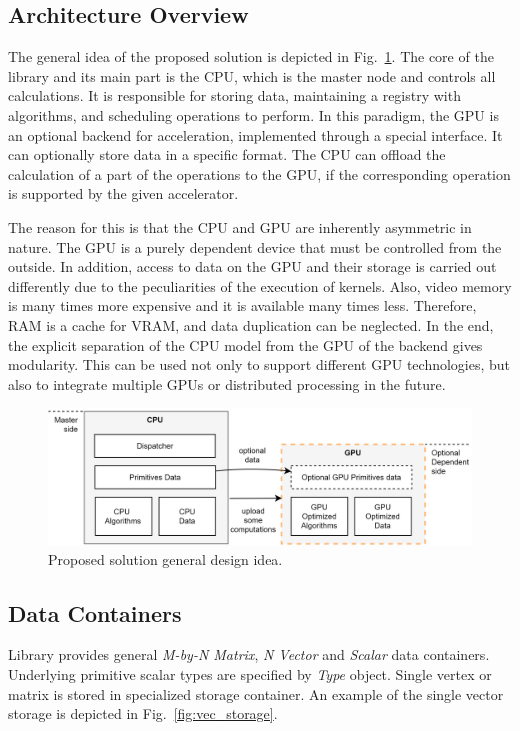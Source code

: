 \subsection{Architecture Overview}

The general idea of the proposed solution is depicted in Fig.~\ref{fig:design}. 
The core of the library and its main part is the CPU, which is the master node and controls all calculations. 
It is responsible for storing data, maintaining a registry with algorithms, and scheduling operations to perform. 
In this paradigm, the GPU is an optional backend for acceleration, implemented through a special interface. 
It can optionally store data in a specific format. 
The CPU can offload the calculation of a part of the operations to the GPU, if the corresponding operation is supported by the given accelerator.

The reason for this is that the CPU and GPU are inherently asymmetric in nature. 
The GPU is a purely dependent device that must be controlled from the outside. In addition, access to data on the GPU and their storage is carried out differently due to the peculiarities of the execution of kernels. 
Also, video memory is many times more expensive and it is available many times less. 
Therefore, RAM is a cache for VRAM, and data duplication can be neglected. 
In the end, the explicit separation of the CPU model from the GPU of the backend gives modularity. 
This can be used not only to support different GPU technologies, but also to integrate multiple GPUs or distributed processing in the future.

\begin{figure}[t]
\centering
\includegraphics[width=0.95\linewidth]{figures/design_idea.png}
\caption{Proposed solution general design idea.}
\label{fig:design}
\end{figure}
    
\subsection{Data Containers}

Library provides general \textit{M-by-N Matrix}, \textit{N Vector} and \textit{Scalar} data containers.
Underlying primitive scalar types are specified by \textit{Type} object. 
Single vertex or matrix is stored in specialized storage container. An example of the single vector storage is depicted in Fig.~\ref{fig:vec_storage}. 


